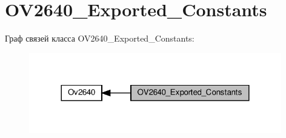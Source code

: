 \hypertarget{group___o_v2640___exported___constants}{}\section{O\+V2640\+\_\+\+Exported\+\_\+\+Constants}
\label{group___o_v2640___exported___constants}
Граф связей класса O\+V2640\+\_\+\+Exported\+\_\+\+Constants\+:
\nopagebreak
\begin{figure}[H]
\begin{center}
\leavevmode
\includegraphics[width=312pt]{group___o_v2640___exported___constants}
\end{center}
\end{figure}
